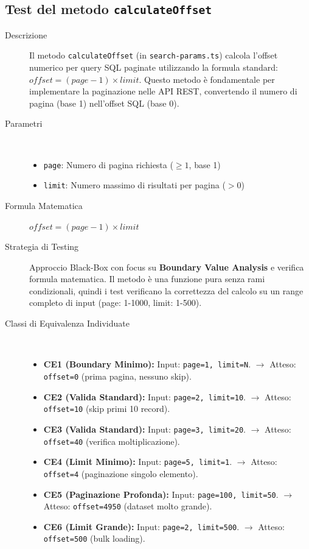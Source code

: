 \subsection{Test del metodo \texttt{calculateOffset}}

\begin{description}
    \item[Descrizione] Il metodo \texttt{calculateOffset} (in \texttt{search-params.ts}) calcola l'offset numerico per query SQL paginate utilizzando la formula standard: $offset = (page - 1) \times limit$. Questo metodo è fondamentale per implementare la paginazione nelle API REST, convertendo il numero di pagina (base 1) nell'offset SQL (base 0).
    
    \item[Parametri] ~\\
    \begin{itemize}
        \item \texttt{page}: Numero di pagina richiesta ($\geq 1$, base 1)
        \item \texttt{limit}: Numero massimo di risultati per pagina ($> 0$)
    \end{itemize}
    
    \item[Formula Matematica] $offset = (page - 1) \times limit$
    
    \item[Strategia di Testing] Approccio Black-Box con focus su \textbf{Boundary Value Analysis} e verifica formula matematica. Il metodo è una funzione pura senza rami condizionali, quindi i test verificano la correttezza del calcolo su un range completo di input (page: 1-1000, limit: 1-500).
    
    \item[Classi di Equivalenza Individuate] ~\\
    \begin{itemize}
        \item \textbf{CE1 (Boundary Minimo):} Input: \texttt{page=1, limit=N}. $\rightarrow$ Atteso: \texttt{offset=0} (prima pagina, nessuno skip).
        \item \textbf{CE2 (Valida Standard):} Input: \texttt{page=2, limit=10}. $\rightarrow$ Atteso: \texttt{offset=10} (skip primi 10 record).
        \item \textbf{CE3 (Valida Standard):} Input: \texttt{page=3, limit=20}. $\rightarrow$ Atteso: \texttt{offset=40} (verifica moltiplicazione).
        \item \textbf{CE4 (Limit Minimo):} Input: \texttt{page=5, limit=1}. $\rightarrow$ Atteso: \texttt{offset=4} (paginazione singolo elemento).
        \item \textbf{CE5 (Paginazione Profonda):} Input: \texttt{page=100, limit=50}. $\rightarrow$ Atteso: \texttt{offset=4950} (dataset molto grande).
        \item \textbf{CE6 (Limit Grande):} Input: \texttt{page=2, limit=500}. $\rightarrow$ Atteso: \texttt{offset=500} (bulk loading).
    \end{itemize}
    

\end{description}
